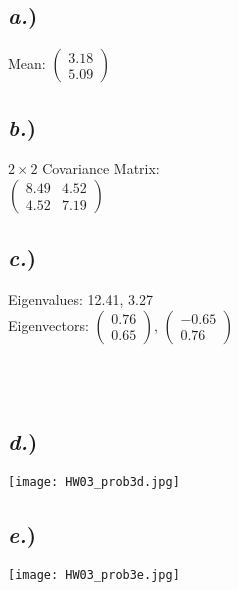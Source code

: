 \documentclass{report}
\begin{document}
\begin{multicols}{3}

\subsection*{\textit{a.})} 
 Mean: $\begin{pmatrix} 3.18 \\ 5.09 \end{pmatrix}$\\

\subsection*{\textit{b.})} 
$2 \times 2$ Covariance Matrix:\\
$\begin{pmatrix} 8.49& 4.52 \\
			4.52 & 7.19 \end{pmatrix}$
			
\subsection*{\textit{c.})} 
Eigenvalues: 12.41, 3.27 \\
Eigenvectors: $\begin{pmatrix} 0.76 \\  0.65 \end{pmatrix}$, $\begin{pmatrix} -0.65 \\ 0.76 \end{pmatrix}$\\

\end{multicols}
\-\\
\-\\
\begin{multicols}{2}

\subsection*{\textit{d.})} 
\texttt{[image: HW03\_prob3d.jpg]}

\subsection*{\textit{e.})} 
\texttt{[image: HW03\_prob3e.jpg]}
\end{multicols}
\end{document}
